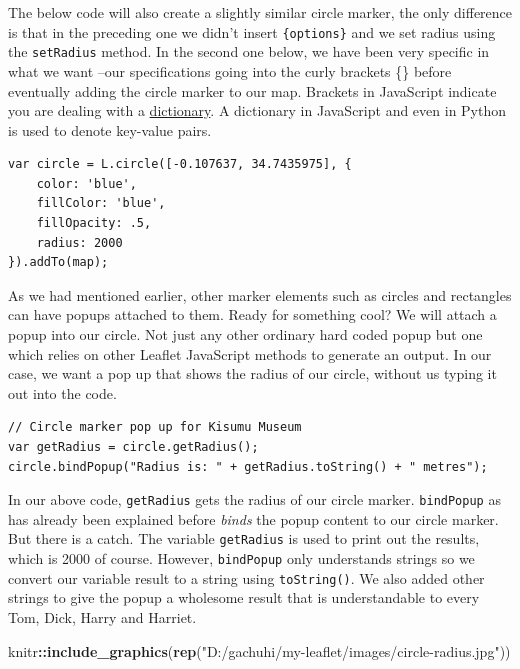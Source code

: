 \documentclass[
]{book}
\newenvironment{Shaded}{\begin{snugshade}}{\end{snugshade}}
\newcommand{\FunctionTok}[1]{\textcolor[rgb]{0.13,0.29,0.53}{\textbf{#1}}}
\newcommand{\NormalTok}[1]{#1}
\newcommand{\SpecialCharTok}[1]{\textcolor[rgb]{0.81,0.36,0.00}{\textbf{#1}}}
\newcommand{\StringTok}[1]{\textcolor[rgb]{0.31,0.60,0.02}{#1}}
\begin{document}
The below code will also create a slightly similar circle marker, the only difference is that in the preceding one we didn't insert \texttt{\{options\}} and we set radius using the \texttt{setRadius} method. In the second one below, we have been very specific in what we want --our specifications going into the curly brackets \{\} before eventually adding the circle marker to our map. Brackets in JavaScript indicate you are dealing with a \href{https://flexiple.com/javascript/javascript-dictionary/}{dictionary}. A dictionary in JavaScript and even in Python is used to denote key-value pairs.

\begin{verbatim}
var circle = L.circle([-0.107637, 34.7435975], {
    color: 'blue',
    fillColor: 'blue',
    fillOpacity: .5,
    radius: 2000
}).addTo(map);
\end{verbatim}

As we had mentioned earlier, other marker elements such as circles and rectangles can have popups attached to them. Ready for something cool? We will attach a popup into our circle. Not just any other ordinary hard coded popup but one which relies on other Leaflet JavaScript methods to generate an output. In our case, we want a pop up that shows the radius of our circle, without us typing it out into the code.

\begin{verbatim}
// Circle marker pop up for Kisumu Museum
var getRadius = circle.getRadius();
circle.bindPopup("Radius is: " + getRadius.toString() + " metres");
\end{verbatim}

In our above code, \texttt{getRadius} gets the radius of our circle marker. \texttt{bindPopup} as has already been explained before \emph{binds} the popup content to our circle marker. But there is a catch. The variable \texttt{getRadius} is used to print out the results, which is 2000 of course. However, \texttt{bindPopup} only understands strings so we convert our variable result to a string using \texttt{toString()}. We also added other strings to give the popup a wholesome result that is understandable to every Tom, Dick, Harry and Harriet.

\begin{Shaded}
\begin{Highlighting}[]
\NormalTok{knitr}\SpecialCharTok{::}\FunctionTok{include\_graphics}\NormalTok{(}\FunctionTok{rep}\NormalTok{(}\StringTok{"D:/gachuhi/my{-}leaflet/images/circle{-}radius.jpg"}\NormalTok{))}
\end{Highlighting}
\end{Shaded}
\end{document}
